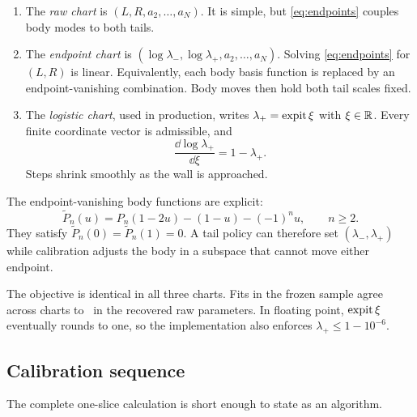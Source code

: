 \begin{enumerate}
\item The \emph{raw chart} is $(L,R,a_2,\ldots,a_N)$.  It is simple, but
\eqref{eq:endpoints} couples body modes to both tails.
\item The \emph{endpoint chart} is
$(\log\lambda_-,\log\lambda_+,a_2,\ldots,a_N)$.  Solving
\eqref{eq:endpoints} for $(L,R)$ is linear.  Equivalently, each body basis
function is replaced by an endpoint-vanishing combination.  Body moves then
hold both tail scales fixed.
\item The \emph{logistic chart}, used in production, writes
$\lambda_+=\operatorname{expit}\xi$ with $\xi\in\mathbb{R}$.  Every finite coordinate vector is
admissible, and
\begin{equation}
\frac{\dd\log\lambda_+}{\dd\xi}=1-\lambda_+.
\label{eq:chartcompression}
\end{equation}
Steps shrink smoothly as the wall is approached.
\end{enumerate}

The endpoint-vanishing body functions are explicit:
\begin{equation}
\widetilde P_n(u)=P_n(1-2u)-(1-u)-(-1)^nu,\qquad n\ge2.
\label{eq:endpointbasis}
\end{equation}
They satisfy $\widetilde P_n(0)=\widetilde P_n(1)=0$.  A tail policy can
therefore set $(\lambda_-,\lambda_+)$ while calibration adjusts the body in a
subspace that cannot move either endpoint.

The objective is identical in all three charts.  Fits in the frozen sample
agree across charts to \MacChartEquivParamAgree\ in the recovered raw
parameters.  In floating point, $\operatorname{expit}\xi$ eventually rounds to one, so the
implementation also enforces $\lambda_+\le1-10^{-6}$.

\subsection{Calibration sequence}

The complete one-slice calculation is short enough to state as an algorithm.

